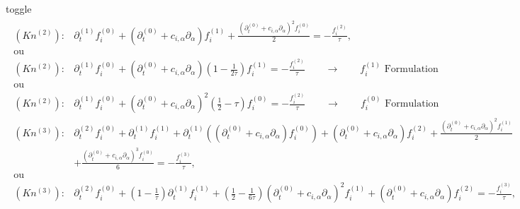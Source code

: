 \documentclass[letterpaper,10pt,english,openany,oneside]{jupyterBook}
\begin{document}
\begin{sphinxuseclass}{toggle}
\begin{equation}
\begin{split}
\begin{array}{ll}
    (Kn^{(2)}):& \partial_{t}^{(1)} f_{i}^{(0)} + \left( \partial_{t}^{(0)} + c_{i,\alpha}\partial_{\alpha} \right)f_{i}^{(1)} + \displaystyle\frac{\left( \partial_{t}^{(0)} + c_{i,\alpha}\partial_{\alpha} \right)^{2} f_{i}^{(0)}}{2}= - \displaystyle\frac{ f_{i}^{(2)} }{ \tau },\\
    \textrm{ou} & \\
    (Kn^{(2)}):& \partial_{t}^{(1)} f_{i}^{(0)} + \left( \partial_{t}^{(0)} + c_{i,\alpha}\partial_{\alpha} \right)\displaystyle\left(1 - \frac{1}{2\tau}\right) f_{i}^{(1)} =  - \displaystyle\frac{ f_{i}^{(2)} }{ \tau } \quad\quad \rightarrow \quad\quad  f_{i}^{(1)}\textrm{ Formulation} \\
    \textrm{ou} & \\
    (Kn^{(2)}):& \partial_{t}^{(1)} f_{i}^{(0)} + \left( \partial_{t}^{(0)} + c_{i,\alpha}\partial_{\alpha} \right)^{2} \displaystyle\left(\frac{1}{2} - \tau\right) f_{i}^{(0)} =  - \displaystyle\frac{ f_{i}^{(2)} }{ \tau } \quad\quad \rightarrow  \quad\quad f_{i}^{(0)}\textrm{ Formulation} \\
    (Kn^{(3)}):& \partial_{t}^{(2)} f_{i}^{(0)} +\partial_{t}^{(1)} f_{i}^{(1)} + \partial_{t}^{(1)}\left( \left( \partial_{t}^{(0)} + c_{i,\alpha}\partial_{\alpha} \right)f_{i}^{(0)} \right) + \left( \partial_{t}^{(0)} + c_{i,\alpha}\partial_{\alpha} \right)f_{i}^{(2)} + \displaystyle\frac{\left( \partial_{t}^{(0)} + c_{i,\alpha}\partial_{\alpha} \right)^{2} f_{i}^{(1)}}{2} \\
    & + \displaystyle\frac{\left( \partial_{t}^{(0)} + c_{i,\alpha}\partial_{\alpha} \right)^{3} f_{i}^{(0)}}{6} = - \displaystyle\frac{ f_{i}^{(3)} }{ \tau },  \\
    \textrm{ou} & \\
    (Kn^{(3)}):& \partial_{t}^{(2)} f_{i}^{(0)} + \left(1-\displaystyle\frac{1}{\tau}\right)\partial_{t}^{(1)} f_{i}^{(1)} + \displaystyle\left(\frac{1}{2} - \frac{1}{6\tau}\right) \left( \partial_{t}^{(0)} + c_{i,\alpha}\partial_{\alpha} \right)^{2} f_{i}^{(1)} + \left( \partial_{t}^{(0)} + c_{i,\alpha}\partial_{\alpha} \right)f_{i}^{(2)} =  - \displaystyle\frac{f_{i}^{(3)}}{\tau},
 \end{array}
\end{split}
\end{equation}
\sphinxAtStartPar
{}


\end{sphinxuseclass}
\end{document}
